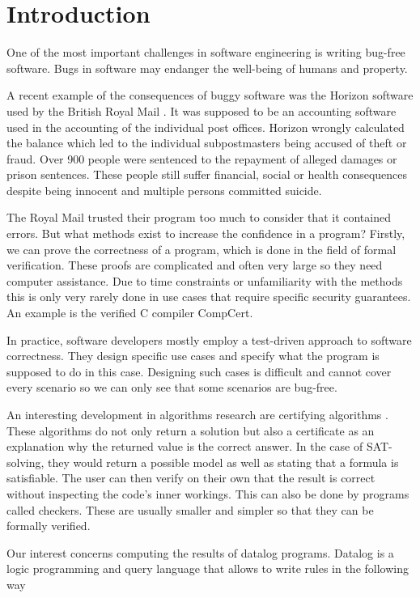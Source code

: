 \section{Introduction}

One of the most important challenges in software engineering is writing bug-free software.  Bugs in software may endanger the well-being of humans and property.

A recent example of the consequences of buggy software was the Horizon software used by the British Royal Mail \cite{horizonRoyalMail}. It was supposed to be an accounting software used in the accounting of the individual post offices. Horizon wrongly calculated the balance which led to the individual subpostmasters being accused of theft or fraud. Over 900 people were sentenced to the repayment of alleged damages or prison sentences. These people still suffer financial, social or health consequences despite being innocent and multiple persons committed suicide.

The Royal Mail trusted their program too much to consider that it contained errors. But what methods exist to increase the confidence in a program?
Firstly, we can prove the correctness of a program, which is done in the field of formal verification. These proofs are complicated and often very large so they need computer assistance. Due to time constraints or unfamiliarity with the methods this is only very rarely done in use cases that require specific security guarantees. An example is the verified C compiler CompCert\cite{CCertComp}.

In practice, software developers mostly employ a test-driven approach to software correctness. They design specific use cases and specify what the program is supposed to do in this case. Designing such cases is difficult and cannot cover every scenario so we can only see that some scenarios are bug-free.

An interesting development in algorithms research are certifying algorithms \cite{CertAlg}. These algorithms do not only return a solution but also a certificate as an explanation why the returned value is the correct answer. In the case of SAT-solving, they would return a possible model as well as stating that a formula is satisfiable. The user can then verify on their own that the result is correct without inspecting the code's inner workings. This can also be done by programs called checkers. These are usually smaller and simpler so that they can be formally verified. 

Our interest concerns computing the results of datalog programs. Datalog is a logic programming and query language that allows to write rules in the following way

